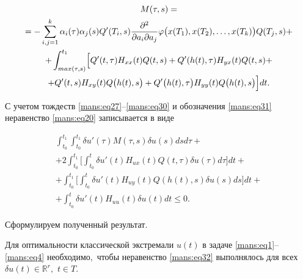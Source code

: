 \begin{multline}

\label{mans:eq31}

M(\tau, s) = \\

=- \sum_{i,j=1}^{k} \alpha_{i} (\tau) \alpha_{j} (s) Q'(T_{i}, s) 

\dfrac{\partial^{2}  } {\partial a_{i} \partial a_{j}}

\varphi\bigl(x(T_{1}), x(T_{2}), \ldots, x(T_{k})\bigr)

 Q(T_{j}, s) + \\

+ \int_{max (\tau, s)}^{t_{1}} 

\Bigl[ Q'(t, \tau) H_{xx}(t) Q(t, s)+Q'(h(t), \tau) H_{yx}(t) Q(t, s)+ \\

+ Q'(t, s) H_{xy}(t) Q\bigl(h(t),  s\bigr) + Q'\bigl(h(t), \tau\bigr) H_{yy}(t) Q\bigl(h(t), s\bigr) \Bigr] dt  . \end{multline}



С учетом тождеств \eqref{mans:eq27}--\eqref{mans:eq30} и обозначения \eqref{mans:eq31} неравенство \eqref{mans:eq20} записывается в виде

\begin{multline}

\label{mans:eq32}

\int_{t_{0}}^{t_{1}} \int_{t_{0}}^{t_{1}} \delta u'(\tau) M(\tau, s) \delta u(s) ds d\tau +

\\ +

2 \int_{t_{0}}^{t_{1}} \biggl[  \int_{t_{0}}^{t} \delta u'(t) H_{ux}(t) Q(t, \tau) \delta u(\tau) d\tau \biggr]  dt + \\

+\int_{t_{0}}^{t_{1}} \biggl[ \int_{t_{0}}^{t} \delta u'(t) H_{uy}(t) Q(h(t), s) \delta u(s) ds \biggr] dt + 

\\

+ \int_{t_{0}}^{t} \delta u'(t) H_{uu}(t) \delta u(t) dt \leq 0 .

\end{multline}



Сформулируем полученный результат.



\smallskip



\begin{theorem}Для оптимальности классической экстремали $ u(t) $  в задаче \eqref{mans:eq1}--\eqref{mans:eq4} необходимо$,$ чтобы неравенство \eqref{mans:eq32} выполнялось для всех  $ \delta u(t) \in \mathbb R^{r}, $  $ t\in T .$

\end{theorem}



